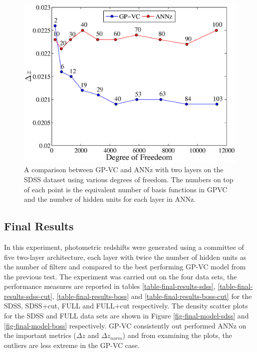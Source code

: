 \documentclass[useAMS,usenatbib,fleqn]{mn2e}
\begin{document}
\begin{figure}
	\centering
	\includegraphics[width=\columnwidth]{figures/sdss_final.eps}
	\caption{A comparison between GP-VC and {\sc ANNz} with two layers on the SDSS dataset using various degrees of freedom. The numbers on top of each point is the equivalent number of basis functions in GPVC and the number of hidden units for each layer in {\sc ANNz}.}
	\label{fig-ann-gpvc-sdss}
\end{figure}

\subsection{Final Results}

In this experiment, photometric redshifts were generated using a committee of five two-layer architecture, each layer with twice the number of hidden units as the number of filters and compared to the best performing GP-VC model from the previous test. The experiment was carried out on the four data sets, the performance measures are reported in tables \ref{table-final-results-sdss}, \ref{table-final-results-sdss-cut}, \ref{table-final-results-boss} and \ref{table-final-results-boss-cut} for the SDSS, SDSS+cut, FULL and FULL+cut respectively. The density scatter plots for the SDSS and FULL data sets are shown in Figure \ref{fig-final-model-sdss} and \ref{fig-final-model-boss} respectively. GP-VC consistently out performed {\sc ANNz} on the important metrics ($\Delta z$ and $\Delta z_{norm}$) and from examining the plots, the outliers are less extreme in the GP-VC case.
\end{document}

